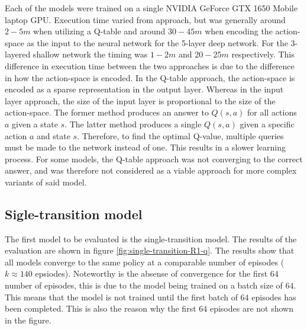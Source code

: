Each of the models were trained on a single NVIDIA GeForce GTX 1650 Mobile laptop GPU. Execution time varied from approach, but was generally around $2 - 5m$ when utilizing a Q-table and around $30 - 45m$ when encoding the action-space as the input to the neural network for the 5-layer deep network. For the 3-layered shallow network the timing was $1 - 2m$ and $20 - 25m$ respectively. This difference in execution time between the two approaches is due to the difference in how the action-space is encoded. In the Q-table approach, the action-space is encoded as a sparse representation in the output layer. Whereas in the input layer approach, the size of the input layer is proportional to the size of the action-space. The former method produces an answer to $Q(s, a)$ for all actions $a$ given a state $s$. The latter method produces a single $Q(s, a)$ given a specific action $a$ and state $s$. Therefore, to find the optimal Q-value, multiple queries must be made to the network instead of one. This results in a slower learning process. For some models, the Q-table approach was not converging to the correct answer, and was therefore not considered as a viable approach for more complex variants of said model.

\newpage
\subsection{Sigle-transition model}

The first model to be evaluated is the single-transition model. The results of the evaluation are shown in figure \ref{fig:single-transition-R1-q}. The results show that all models converge to the same policy at a comparable number of episodes ($k \approx 140$ epsiodes). Noteworthy is the absense of convergence for the first $64$ number of episodes, this is due to the model being trained on a batch size of $64$. This means that the model is not trained until the first batch of $64$ episodes has been completed. This is also the reason why the first $64$ episodes are not shown in the figure.


